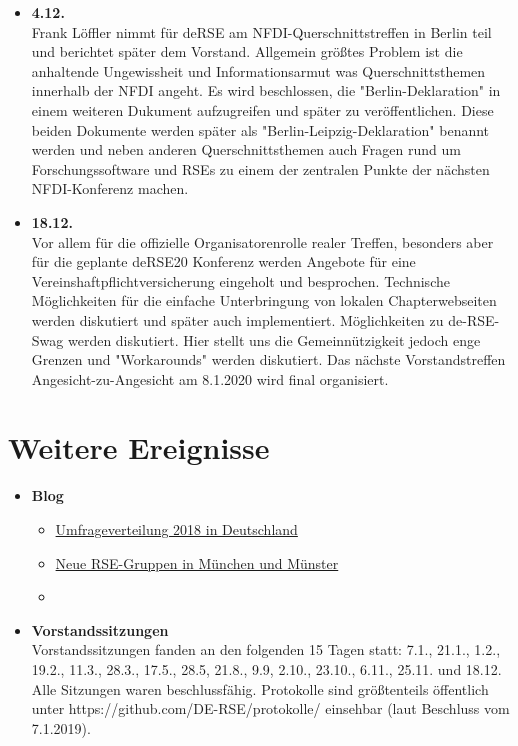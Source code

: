 \begin{itemize}
 \item \textbf{4.12.}\\
 Frank Löffler nimmt für deRSE am NFDI-Querschnittstreffen in Berlin teil und berichtet später dem Vorstand. Allgemein größtes Problem ist die anhaltende Ungewissheit und Informationsarmut was Querschnittsthemen innerhalb der NFDI angeht. Es wird beschlossen, die "Berlin-Deklaration" in einem weiteren Dukument aufzugreifen und später zu veröffentlichen. Diese beiden Dokumente werden später als "Berlin-Leipzig-Deklaration" benannt werden und neben anderen Querschnittsthemen auch Fragen rund um Forschungssoftware und RSEs zu einem der zentralen Punkte der nächsten NFDI-Konferenz machen.

 \item \textbf{18.12.}\\
 Vor allem für die offizielle Organisatorenrolle realer Treffen, besonders aber für die geplante deRSE20 Konferenz werden Angebote für eine Vereinshaftpflichtversicherung eingeholt und besprochen. Technische Möglichkeiten für die einfache Unterbringung von lokalen Chapterwebseiten werden diskutiert und später auch implementiert. Möglichkeiten zu de-RSE-Swag werden diskutiert. Hier stellt uns die Gemeinnützigkeit jedoch enge Grenzen und "Workarounds" werden diskutiert. Das nächste Vorstandstreffen Angesicht-zu-Angesicht am 8.1.2020 wird final organisiert.

\end{itemize}
\section{Weitere Ereignisse}

\begin{itemize}
 \item \textbf{Blog}
 \begin{itemize}
  \item \href{https://www.de-rse.org/blog/2019/01/29/umfrageverteilung-2018-in-deutschland.html}{Umfrageverteilung 2018 in Deutschland}
  \item \href{https://www.de-rse.org/blog/2019/02/26/new-rse-groups-meet-in-munich-and-muenster.html}{Neue RSE-Gruppen in München und Münster}
  \item \href{TODO}{}
 \end{itemize}
 \item \textbf{Vorstandssitzungen}\\
  Vorstandssitzungen fanden an den folgenden 15 Tagen statt: 7.1., 21.1., 1.2., 19.2., 11.3., 28.3., 17.5., 28.5, 21.8., 9.9, 2.10., 23.10., 6.11., 25.11. und 18.12. Alle Sitzungen waren beschlussfähig. Protokolle sind größtenteils öffentlich unter https://github.com/DE-RSE/protokolle/ einsehbar (laut Beschluss vom 7.1.2019).
\end{itemize}

